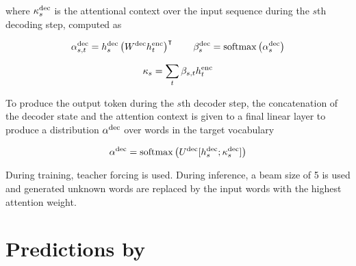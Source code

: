 where $\kappa^{\rm dec}_{s}$ is the attentional context over the input sequence during the $s$th decoding step, computed as

\begin{equation}
\alpha^{\rm dec}_{s, t} = h^{\rm dec}_s \left( W^{\rm dec} h^{\rm enc}_t \right) ^ \intercal
\qquad
\beta^{\rm dec}_s = {\rm softmax} \left( \alpha^{\rm dec}_s \right)
\end{equation}

\begin{equation}
\kappa_s = \sum_t \beta_{s, t} h^{\rm enc}_t
\end{equation}

To produce the output token during the $s$th decoder step, the concatenation of the decoder state and the attention context is given to a final linear layer to produce a distribution $\alpha^{\rm dec}$ over words in the target vocabulary

\begin{equation}
\alpha^{\rm dec} = {\rm softmax} \left(  U^{\rm dec} [h^{\rm dec}_s ; \kappa^{\rm dec}_s]  \right)
\end{equation}

During training, teacher forcing is used.
During inference, a beam size of 5 is used and generated unknown words are replaced by the input words with the highest attention weight.



\section{Predictions by \model}
\label{section:qualitative}

